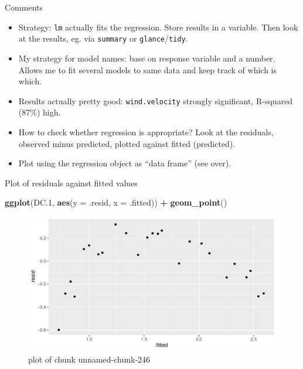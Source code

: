\documentclass[
  ignorenonframetext,
]{beamer}
\newenvironment{Shaded}{\begin{snugshade}}{\end{snugshade}}
\newcommand{\DataTypeTok}[1]{\textcolor[rgb]{0.13,0.29,0.53}{#1}}
\newcommand{\FloatTok}[1]{\textcolor[rgb]{0.00,0.00,0.81}{#1}}
\newcommand{\KeywordTok}[1]{\textcolor[rgb]{0.13,0.29,0.53}{\textbf{#1}}}
\newcommand{\NormalTok}[1]{#1}
\newcommand{\OperatorTok}[1]{\textcolor[rgb]{0.81,0.36,0.00}{\textbf{#1}}}
\newcommand{\StringTok}[1]{\textcolor[rgb]{0.31,0.60,0.02}{#1}}
\providecommand{\tightlist}{%
  \setlength{\itemsep}{0pt}\setlength{\parskip}{0pt}}
\begin{document}
\begin{frame}[fragile]{Comments}
\protect\hypertarget{comments-14}{}

\begin{itemize}
\tightlist
\item
  Strategy: \texttt{lm} actually fits the regression. Store results in a
  variable. Then look at the results, eg. via \texttt{summary} or
  \texttt{glance}/\texttt{tidy}.
\item
  My strategy for model names: base on response variable and a number.
  Allows me to fit several models to same data and keep track of which
  is which.
\item
  Results actually pretty good: \texttt{wind.velocity} strongly
  significant, R-squared (87\%) high.
\item
  How to check whether regression is appropriate? Look at the residuals,
  observed minus predicted, plotted against fitted (predicted).
\item
  Plot using the regression object as ``data frame'' (see over).
\end{itemize}

\end{frame}

\begin{frame}[fragile]{Plot of residuals against fitted values}
\protect\hypertarget{plot-of-residuals-against-fitted-values}{}

\begin{Shaded}
\begin{Highlighting}[]
\KeywordTok{ggplot}\NormalTok{(DC}\FloatTok{.1}\NormalTok{, }\KeywordTok{aes}\NormalTok{(}\DataTypeTok{y =}\NormalTok{ .resid, }\DataTypeTok{x =}\NormalTok{ .fitted)) }\OperatorTok{+}\StringTok{ }\KeywordTok{geom_point}\NormalTok{()}
\end{Highlighting}
\end{Shaded}

\begin{figure}
\centering
\includegraphics{figure/unnamed-chunk-246-1.pdf}
\caption{plot of chunk unnamed-chunk-246}
\end{figure}

\end{frame}
\end{document}

